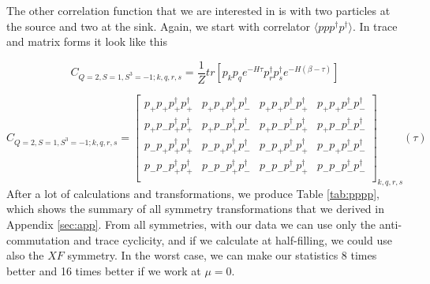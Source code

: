 The other correlation function that we are interested in is with two particles at the source and two at the sink. Again, we start with correlator $\langle ppp^\dagger p^\dagger\rangle$. In trace and matrix forms it look like this

\begin{equation}
  C_{Q=2,S=1,S^3=-1;k,q,r,s} = \frac{1}{Z}tr\left[p_kp_qe^{-H\tau}p^\dagger_rp^\dagger_se^{-H\left(\beta-\tau\right)}\right]
\end{equation}

\renewcommand{\cor}[4]{p_{#1}p_{#2}p^\dagger_{#3}p^\dagger_{#4}}
\begin{equation}
  C_{Q=2,S=1,S^3=-1;k,q,r,s} =
  \left[
  \begin{array}{cccc}
    \cor{+}{+}{+}{+} & \cor{+}{+}{+}{-} & \cor{+}{+}{-}{+} & \cor{+}{+}{-}{-} \\
    \cor{+}{-}{+}{+} & \cor{+}{-}{+}{-} & \cor{+}{-}{-}{+} & \cor{+}{-}{-}{-} \\
    \cor{-}{+}{+}{+} & \cor{-}{+}{+}{-} & \cor{-}{+}{-}{+} & \cor{-}{+}{-}{-} \\
    \cor{-}{-}{+}{+} & \cor{-}{-}{+}{-} & \cor{-}{-}{-}{+} & \cor{-}{-}{-}{-} \\
  \end{array}
  \right]_{k,q,r,s} (\tau)
\end{equation}
After a lot of calculations and transformations, we produce Table \ref{tab:pppp}, which shows the summary of all symmetry transformations that we derived in Appendix \ref{sec:app}. From all symmetries, with our data we can use only the anti-commutation and trace cyclicity, and if we calculate at half-filling, we could use also the $XF$ symmetry. In the worst case, we can make our statistics 8 times better and 16 times better if we work at $\mu = 0$.

